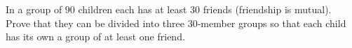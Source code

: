 In a group of $90$ children each has at least $30$ friends (friendship is mutual). Prove that they can be divided into three $30$-member groups so that each child has its own a group of at least one friend.